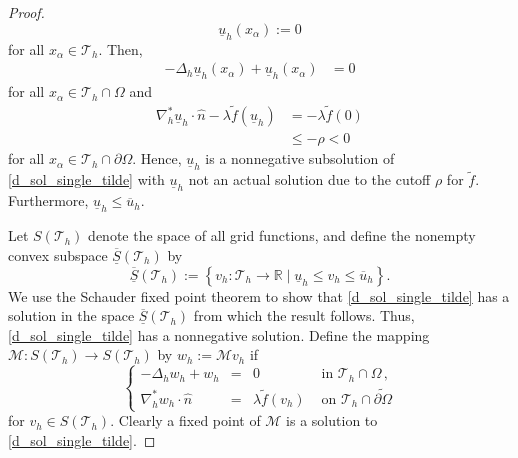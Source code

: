 \documentclass[12pt, reqno]{amsart}
\numberwithin{equation}{section}
\begin{document}
\begin{proof}
\begin{equation}
    \underline{u}_h(x_\alpha) := 0 
\end{equation}
for all $x_\alpha \in \mathcal{T}_h$.  
Then, 
\begin{align*}
    -\Delta_h \underline{u}_h(x_\alpha) + \underline{u}_h(x_\alpha) 
    & = 0 
\end{align*}
for all $x_\alpha \in \mathcal{T}_h \cap \Omega$ 
and 
\begin{align*}
    \nabla_h^* \underline{u}_{h}  \cdot \widehat{n} - \lambda \widetilde{f}(\underline{u}_{h})
    & = - \lambda \widetilde{f}(0) \\ 
    & \leq - \rho < 0 
\end{align*}
for all $x_\alpha \in \mathcal{T}_h \cap \partial \Omega$.  
Hence, $\underline{u}_h$ is a nonnegative subsolution of \eqref{d_sol_single_tilde} 
with $\underline{u}_h$ not an actual solution due to the cutoff $\rho$ for $\widetilde{f}$.  
Furthermore, $\underline{u}_h \leq \overline{u}_h$.  

Let $S(\mathcal{T}_h)$ denote the space of all grid functions, 
and define the nonempty convex subspace $\overline{\underline{S}}(\mathcal{T}_h)$ by 
\[
    \overline{\underline{S}}(\mathcal{T}_h) := \left\{ v_h : \mathcal{T}_h \to \mathbb{R} \mid 
    \underline{u}_h \leq v_h \leq \overline{u}_h \right\} . 
\]
We use the Schauder fixed point theorem to show that \eqref{d_sol_single_tilde} has a solution in the space 
$\overline{\underline{S}}(\mathcal{T}_h)$ from which the result follows.  
Thus, \eqref{d_sol_single_tilde} has a nonnegative solution.  
Define the mapping $\mathcal{M} : S(\mathcal{T}_h) \to S(\mathcal{T}_h)$ by 
$w_h := \mathcal{M} v_h$ if 
\begin{equation}\label{cM_mapping}
    \left\lbrace\begin{array}{rcll}
    -\Delta_{h} w_{h}+ w_{h}&=&0 & \mbox{ in } \mathcal{T}_h \cap \Omega \,, \\
    \nabla_h^* w_{h}  \cdot \widehat{n} &=& \lambda \widetilde{f}(v_{h}  ) & \mbox{ on } \mathcal{T}_h \cap \widetilde{\partial \Omega} 
    \end{array}\right.
\end{equation}
for $v_h \in S(\mathcal{T}_h)$. 
Clearly a fixed point of $\mathcal{M}$ is a solution to \eqref{d_sol_single_tilde}.  


\end{proof}
\end{document}
